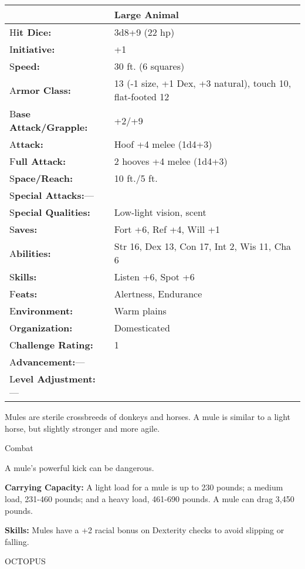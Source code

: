 \documentclass{article}
\begin{document}
\begin{tabular}{|>{\raggedright}p{91pt}|>{\raggedright}p{226pt}|}
\hline
  & Large Animal\tabularnewline
\hline
H\textbf{it Dice:} & 3d8+9 (22 hp)\tabularnewline
\hline
I\textbf{nitiative:} & +1\tabularnewline
\hline
S\textbf{peed:} & 30 ft. (6 squares)\tabularnewline
\hline
A\textbf{rmor Class:} & 13 (-1 size, +1 Dex, +3 natural), touch 10, flat-footed 
12\tabularnewline
\hline
B\textbf{ase Attack/Grapple:} & +2/+9\tabularnewline
\hline
A\textbf{ttack:} & Hoof +4 melee (1d4+3)\tabularnewline
\hline
F\textbf{ull Attack:} & 2 hooves +4 melee (1d4+3)\tabularnewline
\hline
S\textbf{pace/Reach:} & 10 ft./5 ft.\tabularnewline
\hline
S\textbf{pecial Attacks:}--- & \tabularnewline
\hline
S\textbf{pecial Qualities:} & Low-light vision, scent\tabularnewline
\hline
S\textbf{aves:} & Fort +6, Ref +4, Will +1\tabularnewline
\hline
A\textbf{bilities:} & Str 16, Dex 13, Con 17, Int 2, Wis 11, Cha 6\tabularnewline
\hline
S\textbf{kills:} & Listen +6, Spot +6\tabularnewline
\hline
F\textbf{eats:} & Alertness, Endurance\tabularnewline
\hline
E\textbf{nvironment:} & Warm plains\tabularnewline
\hline
O\textbf{rganization:} & Domesticated\tabularnewline
\hline
C\textbf{hallenge Rating:} & 1\tabularnewline
\hline
A\textbf{dvancement:}--- & \tabularnewline
\hline
L\textbf{evel Adjustment:}--- & \tabularnewline
\hline
\end{tabular}

Mules are sterile crossbreeds of donkeys and horses. A mule is similar to a light 
horse, but slightly stronger and more agile.

Combat

A mule's powerful kick can be dangerous.

\textbf{Carrying Capacity: }A light load for a mule is up to 230 pounds; a medium 
load, 231-460 pounds; and a heavy load, 461-690 pounds. A mule can drag 3,450 pounds.

\textbf{Skills: }Mules have a +2 racial bonus on Dexterity checks to avoid slipping 
or falling.

\vspace{12pt}
OCTOPUS
\end{document}
